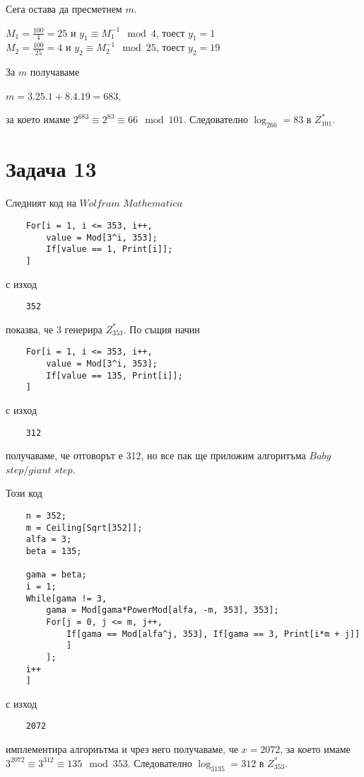 \documentclass{article}
\begin{document}
\justify
Сега остава да пресметнем $m$.
\begin{center}
    $M_1 = \frac{100}{4} = 25$ и $y_1 \equiv M_1^{-1} \mod 4$, тоест $y_1 = 1$ \\
    $M_2 = \frac{100}{25} = 4$ и $y_2 \equiv M_2^{-1} \mod 25$, тоест $y_2 = 19$
\end{center}
За $m$ получаваме 
\begin{center}
    $m = 3.25.1 + 8.4.19 = 683$,
\end{center}
за което имаме $2^{683} \equiv 2^{83} \equiv 66 \mod 101$. Следователно $\log_266 = 83$ в $Z^*_{101}$.

\section*{Задача 13}

\justify
Следният код на $Wolfram$ $Mathematica$ 
\begin{verbatim}
    For[i = 1, i <= 353, i++,
        value = Mod[3^i, 353];
        If[value == 1, Print[i]];
    ]
\end{verbatim}
с изход 
\begin{verbatim}
    352
\end{verbatim}
показва, че 3 генерира $Z^*_{353}$. По същия начин 
\begin{verbatim}
    For[i = 1, i <= 353, i++,
        value = Mod[3^i, 353];
        If[value == 135, Print[i]];
    ]
\end{verbatim}
с изход 
\begin{verbatim}
    312
\end{verbatim}
получаваме, че отговорът е 312, но все пак ще приложим алгоритъма $Baby$ $step/giant$ $step$.

\justify
Този код 
\begin{verbatim}
    n = 352;
    m = Ceiling[Sqrt[352]];
    alfa = 3;
    beta = 135;

    gama = beta;
    i = 1;
    While[gama != 3, 
        gama = Mod[gama*PowerMod[alfa, -m, 353], 353];
        For[j = 0, j <= m, j++,
            If[gama == Mod[alfa^j, 353], If[gama == 3, Print[i*m + j]]
            ]
        ];
    i++
    ]
\end{verbatim}
с изход 
\begin{verbatim}
    2072
\end{verbatim}
имплементира алгориътма и чрез него получаваме, че $x = 2072$, за което имаме $3^{2072} \equiv 3^{312} \equiv 135 \mod 353$. Следователно $\log_3135 = 312$ в $Z^*_{353}$.
\end{document}
